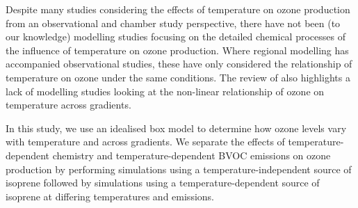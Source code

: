 Despite many studies considering the effects of temperature on ozone production from an observational and chamber study perspective, there have not been (to our knowledge) modelling studies focusing on the detailed chemical processes of the influence of temperature on ozone production.
Where regional modelling has accompanied observational studies, these have only considered the relationship of temperature on ozone under the same  conditions.
The review of \citet{Pusede:2015} also highlights a lack of modelling studies looking at the non-linear relationship of ozone on temperature across  gradients.

In this study, we use an idealised box model to determine how ozone levels vary with temperature and across  gradients.
We separate the effects of temperature-dependent chemistry and temperature-dependent BVOC emissions on ozone production by performing simulations using a temperature-independent source of isoprene followed by simulations using a temperature-dependent source of isoprene at differing temperatures and  emissions. 
